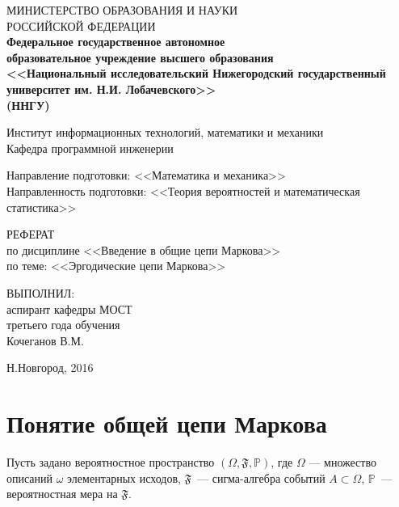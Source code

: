 \documentclass[14pt]{extarticle}
\renewcommand{\Pr}{\mathbb P}
\begin{document}
\begin{titlepage}
  \begin{center}
    МИНИСТЕРСТВО ОБРАЗОВАНИЯ И НАУКИ \\РОССИЙСКОЙ ФЕДЕРАЦИИ \\
    \textbf{%
      Федеральное государственное автономное \\
      образовательное учреждение высшего образования  \\
      <<Национальный исследовательский
      Нижегородский государственный университет им. Н.И. Лобачевского>> \\
      (ННГУ)
    }

 \medskip
 
    Институт информационных технологий, математики и механики \\
    Кафедра программной инженерии

    \medskip

    Направление подготовки: <<Математика и механика>>\\
    Направленность подготовки: <<Теория вероятностей и математическая
    статистика>>

    \vfill

    РЕФЕРАТ \\ по дисциплине <<Введение в общие цепи Маркова>>\\
    по теме: <<Эргодические цепи Маркова>>

    \vfill \hfill
    \begin{minipage}[h]{ 0.5\linewidth}
      ВЫПОЛНИЛ: \\
      аспирант кафедры МОСТ\\
      третьего года обучения\\
      Кочеганов В.М.
    \end{minipage}
    \vfill {Н.Новгород, 2016}
  \end{center}
\end{titlepage}

\tableofcontents

\newpage

\section{Понятие общей цепи Маркова}


Пусть задано вероятностное пространство $(\Omega, \mathfrak F, \Pr)$, где
$\Omega$ --- множество описаний $\omega$ элементарных исходов, $\mathfrak F$~---
сигма-алгебра событий $A\subset \Omega$, $\Pr$~--- вероятностная мера на
$\mathfrak F$. 
\end{document}
